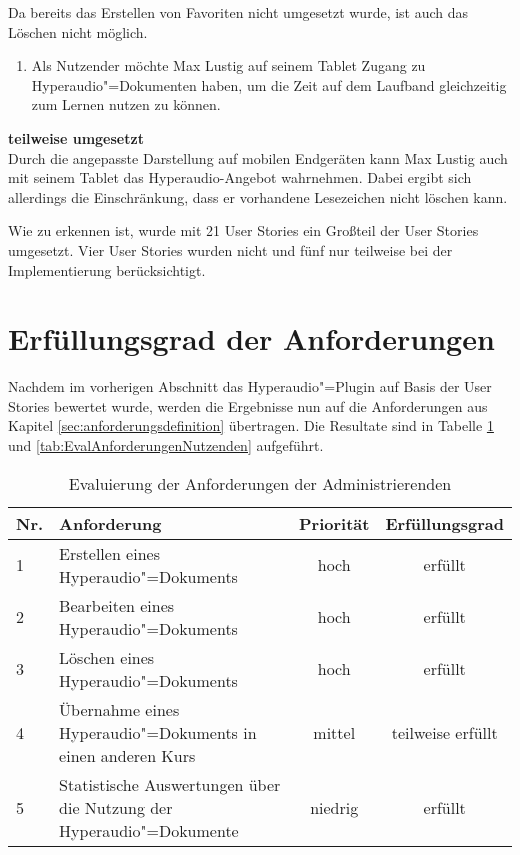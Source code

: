 Da bereits das Erstellen von Favoriten nicht umgesetzt wurde, ist auch das Löschen nicht möglich.
\vspace{0.25cm}
\begin{enumerate}[resume*]
\item \label{US-Zeit-Mobil-Eval} Als Nutzender möchte Max Lustig auf seinem Tablet Zugang zu Hyperaudio"=Dokumenten haben, um die Zeit auf dem Laufband gleichzeitig zum Lernen nutzen zu können.
\end{enumerate}
\vspace{-0.1cm}
\textbf{teilweise umgesetzt}\\
Durch die angepasste Darstellung auf mobilen Endgeräten kann Max Lustig auch mit seinem Tablet das Hyperaudio-Angebot wahrnehmen. Dabei ergibt sich allerdings die Einschränkung, dass er vorhandene Lesezeichen nicht löschen kann.

Wie zu erkennen ist, wurde mit 21 User Stories ein Großteil der User Stories umgesetzt. Vier User Stories wurden nicht und fünf nur teilweise bei der Implementierung berücksichtigt.


\section{Erfüllungsgrad der Anforderungen}
Nachdem im vorherigen Abschnitt das Hyperaudio"=Plugin auf Basis der User Stories bewertet wurde, werden die Ergebnisse nun auf die Anforderungen aus Kapitel \ref{sec:anforderungsdefinition} übertragen. Die Resultate sind in Tabelle \ref{tab:EvalAnforderungenAdministrierenden} und \ref{tab:EvalAnforderungenNutzenden} aufgeführt.


\begin{table}[!ht]
\def\arraystretch{1.4}
\caption{Evaluierung der Anforderungen der Administrierenden}
\label{tab:EvalAnforderungenAdministrierenden}
 \begin{tabularx}{\textwidth}{lXcc}      
    \hline
    Nr. & Anforderung & Priorität & Erfüllungsgrad
    \\\hline
    1 & Erstellen eines Hyperaudio"=Dokuments & hoch & erfüllt\\
    2 & Bearbeiten eines Hyperaudio"=Dokuments & hoch & erfüllt\\
    3 & Löschen eines Hyperaudio"=Dokuments & hoch & erfüllt\\
    4 & Übernahme eines Hyperaudio"=Dokuments in einen anderen Kurs & mittel & teilweise erfüllt\\
    5 & Statistische Auswertungen über die Nutzung der Hyperaudio"=Dokumente & niedrig & erfüllt\\
    \hline
    \end{tabularx}
\end{table}

